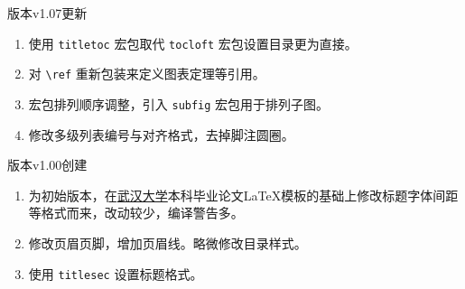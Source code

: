 \noindent\textsf{版本v1.07更新}
\begin{enumerate}[label=\color{three}\protect\circled{\arabic*}]
    \item 使用 \lstinline{titletoc} 宏包取代 \lstinline{tocloft} 宏包设置目录更为直接。
    \item 对 \lstinline{\ref} 重新包装来定义图表定理等引用。
    \item 宏包排列顺序调整，引入 \lstinline{subfig} 宏包用于排列子图。
    \item 修改多级列表编号与对齐格式，去掉脚注圆圈。
\end{enumerate}

\noindent\textsf{版本v1.00创建}
\begin{enumerate}[label=\color{three}\protect\circled{\arabic*}]
    \item 为初始版本，在\href{https://github.com/mtobeiyf/whu-thesis}{武汉大学}本科毕业论文\LaTeX 模板的基础上修改标题字体间距等格式而来，改动较少，编译警告多。
    \item 修改页眉页脚，增加页眉线。略微修改目录样式。
    \item 使用 \lstinline{titlesec} 设置标题格式。
\end{enumerate}